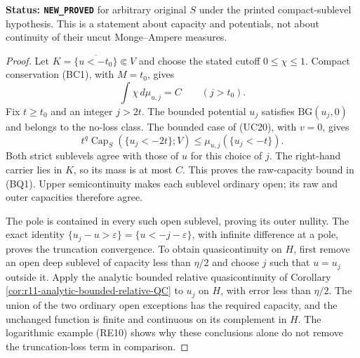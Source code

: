 \documentclass[11pt,a4paper]{article}
\numberwithin{equation}{section}
\theoremstyle{definition}
\theoremstyle{remark}
\begin{document}
\noindent\textbf{Status: \texttt{NEW\_PROVED}} for arbitrary
original $S$ under the printed compact-sublevel hypothesis.
This is a statement about capacity and potentials, not about
continuity of their uncut Monge--Ampere measures.

\begin{proof}
Let $K=\overline{\{u<-t_0\}}\Subset V$ and choose the stated
cutoff $0\leq\chi\leq1$. Compact conservation (BC1), with
$M=t_0$, gives
\[
                        \int\chi\,d\mu_{u,j}=C
                                  \qquad(j>t_0).
\]
Fix $t\geq t_0$ and an integer $j>2t$. The bounded potential
$u_j$ satisfies $\mathrm{BG}(u_j,0)$ and belongs to the no-loss
class. The bounded case of (UC20), with $v=0$, gives
\[
 t^q\operatorname{Cap}_S(\{u_j<-2t\};V)
                   \leq\mu_{u,j}(\{u_j<-t\}).
\]
Both strict sublevels agree with those of $u$ for this choice
of $j$. The right-hand carrier lies in $K$, so its mass is at
most $C$. This proves the raw-capacity bound in (BQ1).
Upper semicontinuity makes each sublevel ordinary open; its
raw and outer capacities therefore agree.

The pole is contained in every such open sublevel, proving its
outer nullity. The exact identity
$\{u_j-u>\varepsilon\}=\{u<-j-\varepsilon\}$, with infinite
difference at a pole, proves the truncation convergence.
To obtain quasicontinuity on $H$, first remove an open deep
sublevel of capacity less than $\eta/2$ and choose $j$ such
that $u=u_j$ outside it. Apply the analytic bounded relative
quasicontinuity of Corollary
\ref{cor:r11-analytic-bounded-relative-QC} to $u_j$ on $H$,
with error less than $\eta/2$. The union of the two ordinary
open exceptions has the required capacity, and the unchanged
function is finite and continuous on its complement in $H$.
The logarithmic example (RE10) shows why these conclusions
alone do not remove the truncation-loss term in comparison.
\end{proof}
\end{document}
